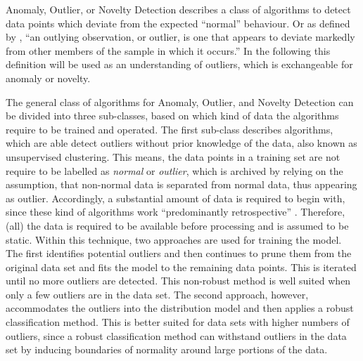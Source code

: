 Anomaly, Outlier, or Novelty Detection describes a class of algorithms to detect data points which deviate from the expected \enquote{normal} behaviour.
Or as defined by \textcite{Grubbs1969}, \enquote{an outlying observation, or outlier, is one that appears to deviate markedly from other members of the sample in which it occurs.}
In the following this definition will be used as an understanding of outliers, which is exchangeable for anomaly or novelty.

The general class of algorithms for Anomaly, Outlier, and Novelty Detection can be divided into three sub-classes, based on which kind of data the algorithms require to be trained and operated.
The first sub-class describes algorithms, which are able detect outliers without prior knowledge of the data, also known as unsupervised clustering.
This means, the data points in a training set are not require to be labelled as \emph{normal} or \emph{outlier}, which is archived by relying on the assumption, that non-normal data is separated from normal data, thus appearing as outlier.
Accordingly, a substantial amount of data is required to begin with, since these kind of algorithms work \enquote{predominantly retrospective} \parencite{Hodge2004}.
Therefore, (all) the data is required to be available before processing and is assumed to be static.
Within this technique, two approaches are used for training the model. 
The first identifies potential outliers and then continues to prune them from the original data set and fits the model to the remaining data points. This is iterated until no more outliers are detected. This non-robust method is well suited when only a few outliers are in the data set.
The second approach, however, accommodates the outliers into the distribution model and then applies a robust classification method. This is better suited for data sets with higher numbers of outliers, since a robust classification method can withstand outliers in the data set by inducing boundaries of normality around large portions of the data. \parencite{Hodge2004}


